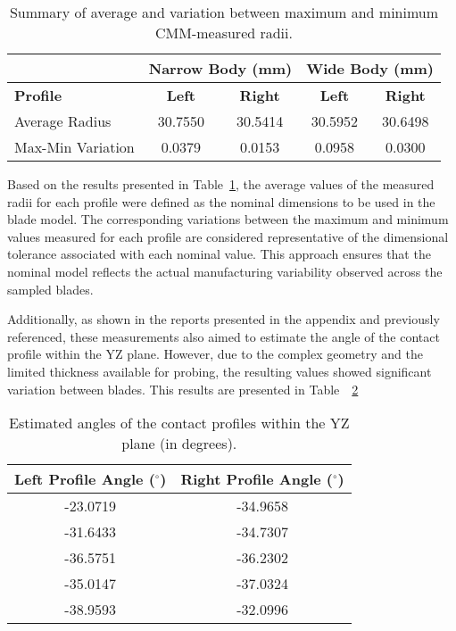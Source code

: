 \begin{table}[H]
    \centering
    \caption{Summary of average and variation between maximum and minimum CMM-measured radii.}
    \label{tab:radii}
    \begin{tabular}{l|cc|cc}
        \hline
        \textbf{} & \multicolumn{2}{c|}{\textbf{Narrow Body (mm)}} & \multicolumn{2}{c}{\textbf{Wide Body (mm)}} \\ \hline
        \textbf{Profile} & \textbf{Left} & \textbf{Right} & \textbf{Left} & \textbf{Right} \\ \hline
        Average Radius & 30.7550 & 30.5414 & 30.5952 & 30.6498 \\
        Max-Min Variation & 0.0379 & 0.0153 & 0.0958 & 0.0300 \\ \hline
    \end{tabular}
\end{table}

Based on the results presented in Table~\ref{tab:radii}, the average values of the measured radii for each profile were defined as the nominal dimensions to be used in the blade model. The corresponding variations between the maximum and minimum values measured for each profile are considered representative of the dimensional tolerance associated with each nominal value. This approach ensures that the nominal model reflects the actual manufacturing variability observed across the sampled blades.

Additionally, as shown in the reports presented in the appendix and previously referenced, these measurements also aimed to estimate the angle of the contact profile within the YZ plane. However, due to the complex geometry and the limited thickness available for probing, the resulting values showed significant variation between blades.
This results are presented in Table~~\ref{tab:angulos}

\begin{table}[H]
    \centering
    \caption{Estimated angles of the contact profiles within the YZ plane (in degrees).}
    \label{tab:angulos}
    \begin{tabular}{c|c}
        \hline
        \textbf{Left Profile Angle ($^{\circ}$)} & \textbf{Right Profile Angle ($^{\circ}$)} \\ \hline
        -23.0719 & -34.9658 \\
        -31.6433 & -34.7307 \\
        -36.5751 & -36.2302 \\
        -35.0147 & -37.0324 \\
        -38.9593 & -32.0996 \\ \hline
    \end{tabular}
\end{table}

